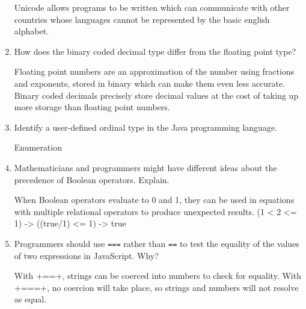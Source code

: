 \begin{enumerate}
  \begin{answer}

    Unicode allows programs to be written which can communicate with other
    countries whose languages cannot be represented by the basic english
    alphabet.

    \end{answer}

  \item How does the binary coded decimal type differ from the
    floating point type?

  \begin{answer}

    Floating point numbers are an approximation of the number using fractions
    and exponents, stored in binary which can make them even less accurate.
    Binary coded decimals precisely store decimal values at the cost of taking
    up more storage than floating point numbers.

    \end{answer}

  \item Identify a user-defined ordinal type in the Java programming
    language.

  \begin{answer}

    Enumeration

    \end{answer}

  \item Mathematicians and programmers might have different ideas
    about the precedence of Boolean operators. Explain.

  \begin{answer}

    When Boolean operators evaluate to 0 and 1, they can be used in equations
    with multiple relational operators to produce unexpected results.
    (1 < 2 <= 1) -> ((true/1) <= 1) -> true

    \end{answer}

  \item Programmers should use \verb+===+ rather than \verb+==+ to
    test the equality of the values of two expressions in JavaScript. Why?

  \begin{answer}

    With +==+, strings can be coerced into numbers to check for equality.
    With +===+, no coercion will take place, so strings and numbers will not
    resolve as equal.


\end{answer}
\end{enumerate}
